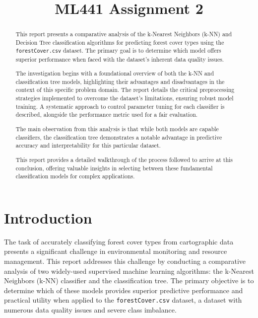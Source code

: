 \documentclass[conference]{IEEEtran}
\begin{document}
\title{ML441 Assignment 2}

\author{
}

\maketitle

\begin{abstract}

This report presents a comparative analysis of the k-Nearest Neighbors (k-NN) and Decision Tree classification algorithms for predicting forest cover types using the \texttt{forestCover.csv} dataset. The primary goal is to determine which model offers superior performance when faced with the dataset's inherent data quality issues.

The investigation begins with a foundational overview of both the k-NN and classification tree models, highlighting their advantages and disadvantages in the context of this specific problem domain. The report details the critical preprocessing strategies implemented to overcome the dataset's limitations, ensuring robust model training. A systematic approach to control parameter tuning for each classifier is described, alongside the performance metric used for a fair evaluation.

The main observation from this analysis is that while both models are capable classifiers, the classification tree demonstrates a notable advantage in predictive accuracy and interpretability for this particular dataset.

This report provides a detailed walkthrough of the process followed to arrive at this conclusion, offering valuable insights in selecting between these fundamental classification models for complex applications.

\end{abstract}

\section{\textbf{Introduction}}

The task of accurately classifying forest cover types from cartographic data presents a significant challenge in environmental monitoring and resource management. This report addresses this challenge by conducting a comparative analysis of two widely-used supervised machine learning algorithms: the k-Nearest Neighbors (k-NN) classifier and the classification tree. The primary objective is to determine which of these models provides superior predictive performance and practical utility when applied to the \texttt{forestCover.csv} dataset, a dataset with numerous data quality issues and severe class imbalance.
\end{document}
